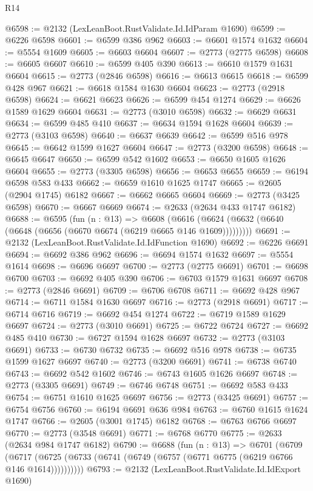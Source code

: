 \begin{lexlean}{R14}
\begin{coremodule}
@6598 := @2132 (LexLeanBoot.RustValidate.Id.IdParam @1690)
@6599 := @6226 @6598
@6601 := @6599 @386 @962
@6603 := @6601 @1574 @1632
@6604 := @5554 @1609
@6605 := @6603 @6604
@6607 := @2773 (@2775 @6598)
@6608 := @6605 @6607
@6610 := @6599 @405 @390
@6613 := @6610 @1579 @1631 @6604
@6615 := @2773 (@2846 @6598)
@6616 := @6613 @6615
@6618 := @6599 @428 @967
@6621 := @6618 @1584 @1630 @6604
@6623 := @2773 (@2918 @6598)
@6624 := @6621 @6623
@6626 := @6599 @454 @1274
@6629 := @6626 @1589 @1629 @6604
@6631 := @2773 (@3010 @6598)
@6632 := @6629 @6631
@6634 := @6599 @485 @410
@6637 := @6634 @1594 @1628 @6604
@6639 := @2773 (@3103 @6598)
@6640 := @6637 @6639
@6642 := @6599 @516 @978
@6645 := @6642 @1599 @1627 @6604
@6647 := @2773 (@3200 @6598)
@6648 := @6645 @6647
@6650 := @6599 @542 @1602
@6653 := @6650 @1605 @1626 @6604
@6655 := @2773 (@3305 @6598)
@6656 := @6653 @6655
@6659 := @6194 @6598 @583 @433
@6662 := @6659 @1610 @1625 @1747
@6665 := @2605 (@2904 @1745) @6182
@6667 := @6662 @6665 @6604
@6669 := @2773 (@3425 @6598)
@6670 := @6667 @6669
@6674 := @2633 (@2634 @433 @1747 @6182)
@6688 := @6595
    (fun (n : @13) =>
    @6608 (@6616 (@6624 (@6632 (@6640 (@6648 (@6656 (@6670 @6674 (@6219 @6665 @146 @1609)))))))))
@6691 := @2132 (LexLeanBoot.RustValidate.Id.IdFunction @1690)
@6692 := @6226 @6691
@6694 := @6692 @386 @962
@6696 := @6694 @1574 @1632
@6697 := @5554 @1614
@6698 := @6696 @6697
@6700 := @2773 (@2775 @6691)
@6701 := @6698 @6700
@6703 := @6692 @405 @390
@6706 := @6703 @1579 @1631 @6697
@6708 := @2773 (@2846 @6691)
@6709 := @6706 @6708
@6711 := @6692 @428 @967
@6714 := @6711 @1584 @1630 @6697
@6716 := @2773 (@2918 @6691)
@6717 := @6714 @6716
@6719 := @6692 @454 @1274
@6722 := @6719 @1589 @1629 @6697
@6724 := @2773 (@3010 @6691)
@6725 := @6722 @6724
@6727 := @6692 @485 @410
@6730 := @6727 @1594 @1628 @6697
@6732 := @2773 (@3103 @6691)
@6733 := @6730 @6732
@6735 := @6692 @516 @978
@6738 := @6735 @1599 @1627 @6697
@6740 := @2773 (@3200 @6691)
@6741 := @6738 @6740
@6743 := @6692 @542 @1602
@6746 := @6743 @1605 @1626 @6697
@6748 := @2773 (@3305 @6691)
@6749 := @6746 @6748
@6751 := @6692 @583 @433
@6754 := @6751 @1610 @1625 @6697
@6756 := @2773 (@3425 @6691)
@6757 := @6754 @6756
@6760 := @6194 @6691 @636 @984
@6763 := @6760 @1615 @1624 @1747
@6766 := @2605 (@3001 @1745) @6182
@6768 := @6763 @6766 @6697
@6770 := @2773 (@3548 @6691)
@6771 := @6768 @6770
@6775 := @2633 (@2634 @984 @1747 @6182)
@6790 := @6688
    (fun (n : @13) =>
    @6701
      (@6709
        (@6717 (@6725 (@6733 (@6741 (@6749 (@6757 (@6771 @6775 (@6219 @6766 @146 @1614))))))))))
@6793 := @2132 (LexLeanBoot.RustValidate.Id.IdExport @1690)

\end{coremodule}
\end{lexlean}
